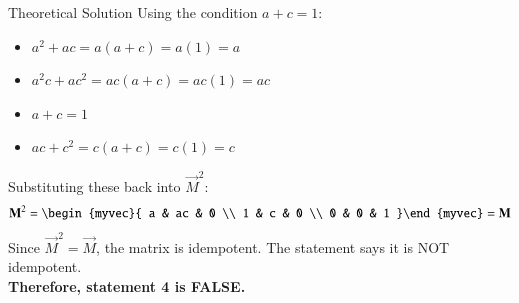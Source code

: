\documentclass{beamer}
\begin{document}
\begin{frame}{Theoretical Solution}
Using the condition $a+c=1$:
\begin{itemize}
    \item $a^2+ac = a(a+c) = a(1) = a$
    \item $a^2c+ac^2 = ac(a+c) = ac(1) = ac$
    \item $a+c = 1$
    \item $ac+c^2 = c(a+c) = c(1) = c$
\end{itemize}
Substituting these back into $\vec{M}^2$:
\begin{align} \vec{M}^2 = \begin{myvec}{ a & ac & 0 \\ 1 & c & 0 \\ 0 & 0 & 1 }\end{myvec} = \vec{M} \end{align}
Since $\vec{M}^2=\vec{M}$, the matrix is idempotent. The statement says it is NOT idempotent. \\
\textbf{Therefore, statement 4 is FALSE.}

\end{frame}
\end{document}

